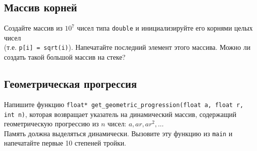 \documentclass{article}
\begin{document}
\subsection{Массив корней}
Создайте массив из $10^7$ чисел типа \texttt{double} и инициализируйте его корнями
целых чисел\\ (т.е. \texttt{p[i] = sqrt(i)}). Напечатайте последний элемент этого массива. Можно ли 
создать такой большой массив на стеке?

\subsection{Геометрическая прогрессия}
Напишите функцию \texttt{float* get\_geometric\_progression(float a, float r, int n)}, которая возвращает указатель на динамический массив, содержащий геометрическую прогрессию из $n$ чисел: 
$a, ar, ar^2, ...$\\
Память должна выделяться динамически. Вызовите эту функцию из \texttt{main} и напечатайте первые 10 степеней тройки.
\end{document}
